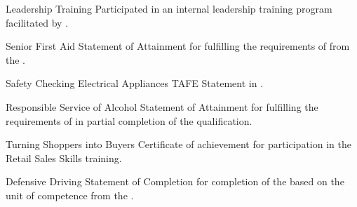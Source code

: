 \begin{qualifications}

{Leadership Training}
{Participated in an internal leadership training program facilitated by
.}

{Senior First Aid}
{Statement of Attainment for fulfilling the requirements of
 from the
.}

{Safety Checking Electrical Appliances}
{TAFE Statement in .}

{Responsible Service of Alcohol}
{Statement of Attainment for fulfilling the requirements of
 in
partial completion of the  qualification.}

{Turning Shoppers into Buyers}
{Certificate of achievement for participation in the 
 Retail Sales Skills training.}

{Defensive Driving}
{Statement of Completion for completion of the  based on the unit of competence
 from the
.}

\end{qualifications}

